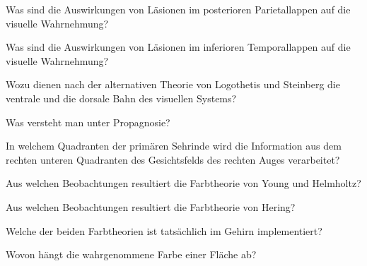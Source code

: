 \documentclass[10pt, a4paper]{exam}
\begin{document}
\begin{questions}
\begin{solution}
  \end{solution}

  \question Was sind die Auswirkungen von Läsionen im posterioren Parietallappen auf die visuelle Wahrnehmung?
  \begin{solution}

  \end{solution}

  \question Was sind die Auswirkungen von Läsionen im inferioren Temporallappen auf die visuelle Wahrnehmung?
  \begin{solution}

  \end{solution}

  \question Wozu dienen nach der alternativen Theorie von Logothetis und Steinberg die ventrale und die dorsale Bahn des visuellen Systems?
  \begin{solution}

  \end{solution}

  \question Was versteht man unter Propagnosie?
  \begin{solution}

  \end{solution}

  \question In welchem Quadranten der primären Sehrinde wird die Information aus dem rechten unteren Quadranten des Gesichtsfelds des rechten Auges verarbeitet?
  \begin{solution}

  \end{solution}

  \question Aus welchen Beobachtungen resultiert die Farbtheorie von Young und Helmholtz?
  \begin{solution}

  \end{solution}

  \question Aus welchen Beobachtungen resultiert die Farbtheorie von Hering?
  \begin{solution}

  \end{solution}

  \question Welche der beiden Farbtheorien ist tatsächlich im Gehirn implementiert?
  \begin{solution}

  \end{solution}

  \question Wovon hängt die wahrgenommene Farbe einer Fläche ab?
  \begin{solution}


\end{solution}
\end{questions}
\end{document}

